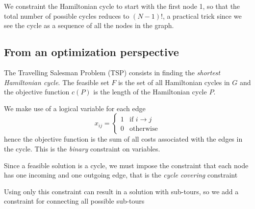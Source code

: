We constraint the Hamiltonian cycle to start with the first node 1, so that the total number of possible cycles reduces to $(N-1)!$, a practical trick since we see the cycle as a sequence of all the nodes in the graph.


\subsection{From an optimization perspective}
The Travelling Salesman Problem (TSP) consists in finding the \emph{shortest Hamiltonian cycle}. The feasible set $F$ is the set of all Hamiltonian cycles in $G$ and the objective function $c(P)$ is the length of the Hamiltonian cycle $P$.

We make use of a logical variable for each edge
\[
x_{ij}=
\begin{cases}
	1 & \text{if $i\rightarrow j$} \\
	0 & \text{otherwise}
\end{cases}
\]
hence the objective function is the sum of all costs associated with the edges in the cycle. This is the \emph{binary} constraint on variables.

Since a feasible solution is a cycle, we must impose the constraint that each node has one incoming and one outgoing edge, that is the \emph{cycle covering} constraint

\begin{center}
\end{center}

Using only this constraint can result in a solution with sub-tours, so we add a constraint for connecting all possible sub-tours

